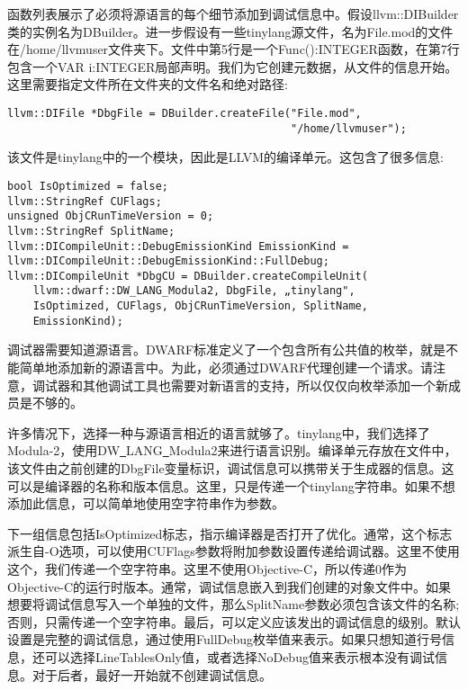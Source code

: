 函数列表展示了必须将源语言的每个细节添加到调试信息中。假设llvm::DIBuilder类的实例名为DBuilder。进一步假设有一些tinylang源文件，名为File.mod的文件在/home/llvmuser文件夹下。文件中第5行是一个Func():INTEGER函数，在第7行包含一个VAR i:INTEGER局部声明。我们为它创建元数据，从文件的信息开始。这里需要指定文件所在文件夹的文件名和绝对路径:\par

\begin{lstlisting}[caption={}]
llvm::DIFile *DbgFile = DBuilder.createFile("File.mod",
											"/home/llvmuser");
\end{lstlisting}

该文件是tinylang中的一个模块，因此是LLVM的编译单元。这包含了很多信息:\par

\begin{lstlisting}[caption={}]
bool IsOptimized = false;
llvm::StringRef CUFlags;
unsigned ObjCRunTimeVersion = 0;
llvm::StringRef SplitName;
llvm::DICompileUnit::DebugEmissionKind EmissionKind =
llvm::DICompileUnit::DebugEmissionKind::FullDebug;
llvm::DICompileUnit *DbgCU = DBuilder.createCompileUnit(
	llvm::dwarf::DW_LANG_Modula2, DbgFile, „tinylang",
	IsOptimized, CUFlags, ObjCRunTimeVersion, SplitName,
	EmissionKind);
\end{lstlisting}

调试器需要知道源语言。DWARF标准定义了一个包含所有公共值的枚举，就是不能简单地添加新的源语言中。为此，必须通过DWARF代理创建一个请求。请注意，调试器和其他调试工具也需要对新语言的支持，所以仅仅向枚举添加一个新成员是不够的。\par

许多情况下，选择一种与源语言相近的语言就够了。tinylang中，我们选择了Modula-2，使用DW\underline{~}LANG\underline{~}Modula2来进行语言识别。编译单元存放在文件中，该文件由之前创建的DbgFile变量标识，调试信息可以携带关于生成器的信息。这可以是编译器的名称和版本信息。这里，只是传递一个tinylang字符串。如果不想添加此信息，可以简单地使用空字符串作为参数。\par

下一组信息包括IsOptimized标志，指示编译器是否打开了优化。通常，这个标志派生自-O选项，可以使用CUFlags参数将附加参数设置传递给调试器。这里不使用这个，我们传递一个空字符串。这里不使用Objective-C，所以传递0作为Objective-C的运行时版本。通常，调试信息嵌入到我们创建的对象文件中。如果想要将调试信息写入一个单独的文件，那么SplitName参数必须包含该文件的名称;否则，只需传递一个空字符串。最后，可以定义应该发出的调试信息的级别。默认设置是完整的调试信息，通过使用FullDebug枚举值来表示。如果只想知道行号信息，还可以选择LineTablesOnly值，或者选择NoDebug值来表示根本没有调试信息。对于后者，最好一开始就不创建调试信息。\par

